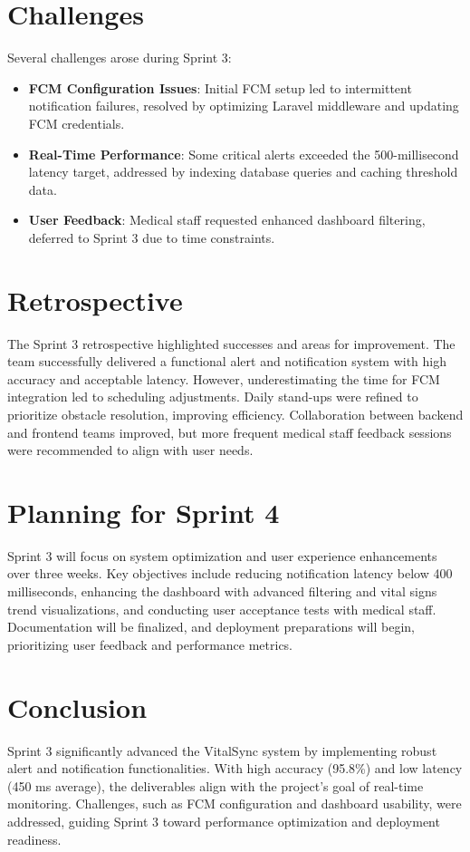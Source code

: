 \section{Challenges}
Several challenges arose during Sprint 3:
\begin{itemize}
    \item \textbf{FCM Configuration Issues}: Initial FCM setup led to intermittent notification failures, resolved by optimizing Laravel middleware and updating FCM credentials.
    \item \textbf{Real-Time Performance}: Some critical alerts exceeded the 500-millisecond latency target, addressed by indexing database queries and caching threshold data.
    \item \textbf{User Feedback}: Medical staff requested enhanced dashboard filtering, deferred to Sprint 3 due to time constraints.
\end{itemize}

\section{Retrospective}
The Sprint 3 retrospective highlighted successes and areas for improvement. The team successfully delivered a functional alert and notification system with high accuracy and acceptable latency. However, underestimating the time for FCM integration led to scheduling adjustments. Daily stand-ups were refined to prioritize obstacle resolution, improving efficiency. Collaboration between backend and frontend teams improved, but more frequent medical staff feedback sessions were recommended to align with user needs.

\section{Planning for Sprint 4
}
Sprint 3 will focus on system optimization and user experience enhancements over three weeks. Key objectives include reducing notification latency below 400 milliseconds, enhancing the dashboard with advanced filtering and vital signs trend visualizations, and conducting user acceptance tests with medical staff. Documentation will be finalized, and deployment preparations will begin, prioritizing user feedback and performance metrics.

\section{Conclusion}
Sprint 3 significantly advanced the VitalSync system by implementing robust alert and notification functionalities. With high accuracy (95.8\%) and low latency (450 ms average), the deliverables align with the project’s goal of real-time monitoring. Challenges, such as FCM configuration and dashboard usability, were addressed, guiding Sprint 3 toward performance optimization and deployment readiness.